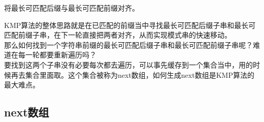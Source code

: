将最长可匹配后缀与最长可匹配前缀对齐。

\begin{table}[H]
	\centering
\end{table}

KMP算法的整体思路就是在已匹配的前缀当中寻找最长可匹配后缀子串和最长可匹配前缀子串，在下一轮直接把两者对齐，从而实现模式串的快速移动。 \\

那么如何找到一个字符串前缀的最长可匹配后缀子串和最长可匹配前缀子串呢？难道在每一轮都要重新遍历吗？ \\

要找到这两个子串没有必要每次都去遍历，可以事先缓存到一个集合当中，用的时候再去集合里面取。这个集合被称为next数组，如何生成next数组是KMP算法的最大难点。

\subsection{next数组}